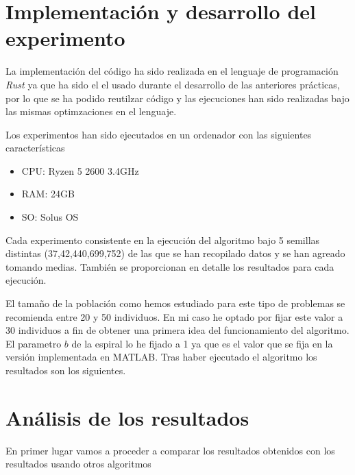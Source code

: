 \documentclass[11pt]{article}
\begin{document}
\section{Implementación y desarrollo del experimento}

La implementación del código ha sido realizada en el lenguaje de programación
\textit{Rust} ya que ha sido el el usado durante el desarrollo de las anteriores
prácticas, por lo que se ha podido reutilzar código y las ejecuciones han sido
realizadas bajo las mismas optimzaciones en el lenguaje.

Los experimentos han sido ejecutados en un ordenador con las siguientes
características

\begin{itemize}
  \item CPU: Ryzen 5 2600 3.4GHz
  \item RAM: 24GB
  \item SO: Solus OS
\end{itemize}

Cada experimento consistente en la ejecución del algoritmo bajo 5 semillas
distintas (37,42,440,699,752) de las que se han recopilado datos y se han
agreado tomando medias. También se proporcionan en detalle los resultados para
cada ejecución.

El tamaño de la población como hemos estudiado para este tipo de problemas se
recomienda entre 20 y 50 individuos. En mi caso he optado por fijar este valor a
30 individuos a fin de obtener una primera idea del funcionamiento del
algoritmo. El parametro $b$ de la espiral lo he fijado a 1 ya que es el valor
que se fija en la versión implementada en MATLAB. Tras haber
ejecutado el algoritmo los resultados son los siguientes.




\section{Análisis de los resultados}

En primer lugar vamos a proceder a comparar los resultados obtenidos con los
resultados usando otros algoritmos 
\end{document}
